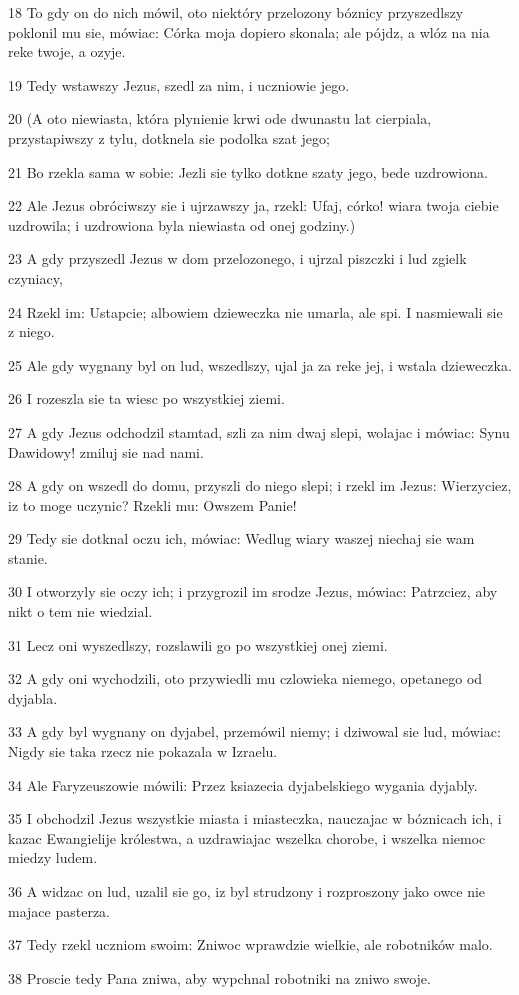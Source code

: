 \par 18 To gdy on do nich mówil, oto niektóry przelozony bóznicy przyszedlszy poklonil mu sie, mówiac: Córka moja dopiero skonala; ale pójdz, a wlóz na nia reke twoje, a ozyje.
\par 19 Tedy wstawszy Jezus, szedl za nim, i uczniowie jego.
\par 20 (A oto niewiasta, która plynienie krwi ode dwunastu lat cierpiala, przystapiwszy z tylu, dotknela sie podolka szat jego;
\par 21 Bo rzekla sama w sobie: Jezli sie tylko dotkne szaty jego, bede uzdrowiona.
\par 22 Ale Jezus obróciwszy sie i ujrzawszy ja, rzekl: Ufaj, córko! wiara twoja ciebie uzdrowila; i uzdrowiona byla niewiasta od onej godziny.)
\par 23 A gdy przyszedl Jezus w dom przelozonego, i ujrzal piszczki i lud zgielk czyniacy,
\par 24 Rzekl im: Ustapcie; albowiem dzieweczka nie umarla, ale spi. I nasmiewali sie z niego.
\par 25 Ale gdy wygnany byl on lud, wszedlszy, ujal ja za reke jej, i wstala dzieweczka.
\par 26 I rozeszla sie ta wiesc po wszystkiej ziemi.
\par 27 A gdy Jezus odchodzil stamtad, szli za nim dwaj slepi, wolajac i mówiac: Synu Dawidowy! zmiluj sie nad nami.
\par 28 A gdy on wszedl do domu, przyszli do niego slepi; i rzekl im Jezus: Wierzyciez, iz to moge uczynic? Rzekli mu: Owszem Panie!
\par 29 Tedy sie dotknal oczu ich, mówiac: Wedlug wiary waszej niechaj sie wam stanie.
\par 30 I otworzyly sie oczy ich; i przygrozil im srodze Jezus, mówiac: Patrzciez, aby nikt o tem nie wiedzial.
\par 31 Lecz oni wyszedlszy, rozslawili go po wszystkiej onej ziemi.
\par 32 A gdy oni wychodzili, oto przywiedli mu czlowieka niemego, opetanego od dyjabla.
\par 33 A gdy byl wygnany on dyjabel, przemówil niemy; i dziwowal sie lud, mówiac: Nigdy sie taka rzecz nie pokazala w Izraelu.
\par 34 Ale Faryzeuszowie mówili: Przez ksiazecia dyjabelskiego wygania dyjably.
\par 35 I obchodzil Jezus wszystkie miasta i miasteczka, nauczajac w bóznicach ich, i kazac Ewangielije królestwa, a uzdrawiajac wszelka chorobe, i wszelka niemoc miedzy ludem.
\par 36 A widzac on lud, uzalil sie go, iz byl strudzony i rozproszony jako owce nie majace pasterza.
\par 37 Tedy rzekl uczniom swoim: Zniwoc wprawdzie wielkie, ale robotników malo.
\par 38 Proscie tedy Pana zniwa, aby wypchnal robotniki na zniwo swoje.

